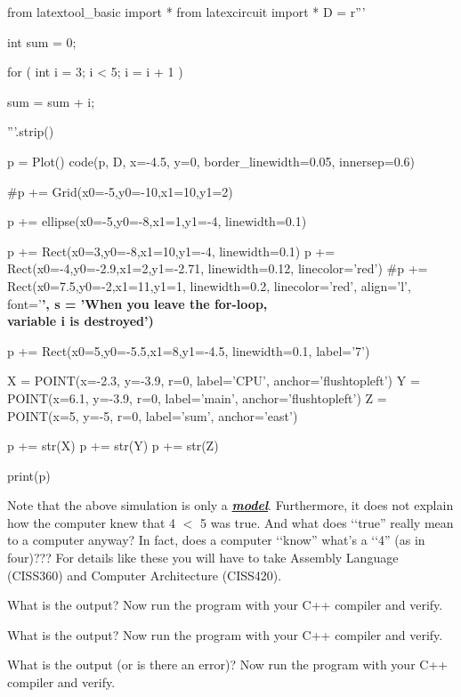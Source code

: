 \begin{python}
from latextool_basic import *
from latexcircuit import *
D = r'''



int sum = 0;

    for ( int i = 3;     i < 5;     i = i + 1 )


        sum = sum + i;



'''.strip()

p = Plot()
code(p, D, x=-4.5, y=0, border_linewidth=0.05, innersep=0.6)

#p += Grid(x0=-5,y0=-10,x1=10,y1=2)

p += ellipse(x0=-5,y0=-8,x1=1,y1=-4, linewidth=0.1)

p += Rect(x0=3,y0=-8,x1=10,y1=-4, linewidth=0.1)
p += Rect(x0=-4,y0=-2.9,x1=2,y1=-2.71, linewidth=0.12, linecolor='red')
#p += Rect(x0=7.5,y0=-2,x1=11,y1=1, linewidth=0.2, linecolor='red', align='l', font='\normalsize\bfseries', s = 'When you leave the for-loop, \\ variable i is destroyed')

p += Rect(x0=5,y0=-5.5,x1=8,y1=-4.5, linewidth=0.1, label='7')

X = POINT(x=-2.3, y=-3.9, r=0, label='CPU', anchor='flushtopleft')
Y = POINT(x=6.1, y=-3.9, r=0, label='main', anchor='flushtopleft')
Z = POINT(x=5, y=-5, r=0, label='sum', anchor='east')

p += str(X)
p += str(Y)
p += str(Z)

print(p)
\end{python}
\sidenote
{
}

Note that the above simulation is only a \emph{\textbf{\underline{model}}}.
Furthermore, it does not explain how the computer knew that 4 $<$ 5 was true. And what does \lq\lq true'' really mean to a computer anyway? In fact, does a computer \lq\lq know'' what's a \lq\lq 4''  (as in four)??? For details like these you will have to take Assembly Language (CISS360) and Computer Architecture (CISS420).



What is the output? Now run the program with your C++ compiler and
verify.


What is the output? Now run the program with your C++ compiler and
verify.

What is the output (or is there an error)? Now run the program with your
C++ compiler and verify.

